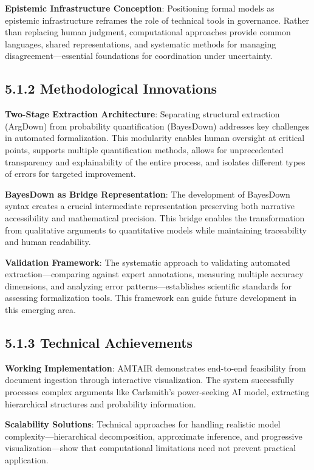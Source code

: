 \documentclass[
  11pt,
  letterpaper,
  openany]{book}
\begin{document}
\textbf{Epistemic Infrastructure Conception}: Positioning formal models
as epistemic infrastructure reframes the role of technical tools in
governance. Rather than replacing human judgment, computational
approaches provide common languages, shared representations, and
systematic methods for managing disagreement---essential foundations for
coordination under uncertainty.

\subsection{5.1.2 Methodological
Innovations}\label{sec-methodological-innovations}

\textbf{Two-Stage Extraction Architecture}: Separating structural
extraction (ArgDown) from probability quantification (BayesDown)
addresses key challenges in automated formalization. This modularity
enables human oversight at critical points, supports multiple
quantification methods, allows for unprecedented transparency and
explainability of the entire process, and isolates different types of
errors for targeted improvement.

\textbf{BayesDown as Bridge Representation}: The development of
BayesDown syntax creates a crucial intermediate representation
preserving both narrative accessibility and mathematical precision. This
bridge enables the transformation from qualitative arguments to
quantitative models while maintaining traceability and human
readability.

\textbf{Validation Framework}: The systematic approach to validating
automated extraction---comparing against expert annotations, measuring
multiple accuracy dimensions, and analyzing error patterns---establishes
scientific standards for assessing formalization tools. This framework
can guide future development in this emerging area.

\subsection{5.1.3 Technical
Achievements}\label{sec-technical-achievements}

\textbf{Working Implementation}: AMTAIR demonstrates end-to-end
feasibility from document ingestion through interactive visualization.
The system successfully processes complex arguments like Carlsmith's
power-seeking AI model, extracting hierarchical structures and
probability information.

\textbf{Scalability Solutions}: Technical approaches for handling
realistic model complexity---hierarchical decomposition, approximate
inference, and progressive visualization---show that computational
limitations need not prevent practical application.
\end{document}
